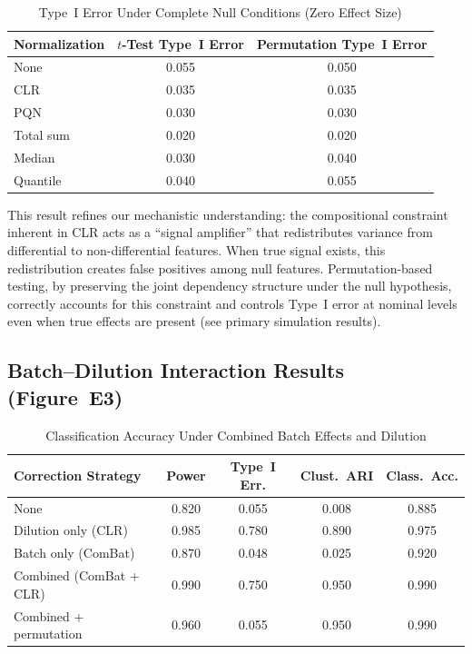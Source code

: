 \documentclass[12pt]{article}
\begin{document}
\begin{table}[ht!]
\centering
\caption{Type~I Error Under Complete Null Conditions (Zero Effect Size)}
\label{tab:type1_null}
\begin{tabular}{lcc}
\toprule
Normalization & $t$-Test Type~I Error & Permutation Type~I Error \\
\midrule
None & 0.055 & 0.050 \\
CLR & 0.035 & 0.035 \\
PQN & 0.030 & 0.030 \\
Total sum & 0.020 & 0.020 \\
Median & 0.030 & 0.040 \\
Quantile & 0.040 & 0.055 \\
\bottomrule
\end{tabular}
\end{table}

This result refines our mechanistic understanding: the compositional constraint inherent in CLR acts as a ``signal amplifier'' that redistributes variance from differential to non-differential features. When true signal exists, this redistribution creates false positives among null features. Permutation-based testing, by preserving the joint dependency structure under the null hypothesis, correctly accounts for this constraint and controls Type~I error at nominal levels even when true effects are present (see primary simulation results).

\subsection{Batch--Dilution Interaction Results (Figure~E3)}

\begin{table}[ht!]
\centering
\caption{Classification Accuracy Under Combined Batch Effects and Dilution}
\label{tab:batch_dilution}
\begin{tabular}{lcccc}
\toprule
Correction Strategy & Power & Type~I Err. & Clust.\ ARI & Class.\ Acc. \\
\midrule
None & 0.820 & 0.055 & 0.008 & 0.885 \\
Dilution only (CLR) & 0.985 & 0.780 & 0.890 & 0.975 \\
Batch only (ComBat) & 0.870 & 0.048 & 0.025 & 0.920 \\
Combined (ComBat + CLR) & 0.990 & 0.750 & 0.950 & 0.990 \\
Combined + permutation & 0.960 & 0.055 & 0.950 & 0.990 \\
\bottomrule
\end{tabular}
\end{table}
\end{document}
